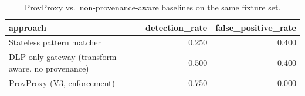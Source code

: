 \begin{table}[t]
\centering
\caption{ProvProxy vs.\ non-provenance-aware baselines on the same fixture set.}
\label{tab:baseline_comparison}
\begin{tabular}{lrr}
\toprule
approach & detection\_rate & false\_positive\_rate \\
\midrule
Stateless pattern matcher & 0.250 & 0.400 \\
DLP-only gateway (transform-aware, no provenance) & 0.500 & 0.400 \\
ProvProxy (V3, enforcement) & 0.750 & 0.000 \\
\bottomrule
\end{tabular}
\end{table}